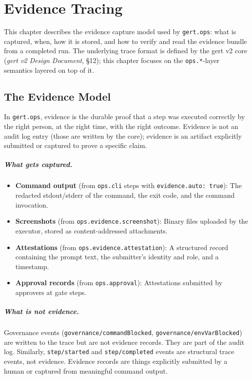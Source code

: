 \chapter{Evidence Tracing}
\label{ch:evidence-tracing}

This chapter describes the evidence capture model used by \texttt{gert.ops}: what is captured,
when, how it is stored, and how to verify and read the evidence bundle from a completed run.
The underlying trace format is defined by the gert v2 core (\emph{gert v2 Design Document}, §12);
this chapter focuses on the \texttt{ops.*}-layer semantics layered on top of it.

\section{The Evidence Model}
\label{sec:evidence-model}

In \texttt{gert.ops}, evidence is the durable proof that a step was executed correctly by
the right person, at the right time, with the right outcome. Evidence is not an audit log
entry (those are written by the core); evidence is an artifact explicitly submitted or
captured to prove a specific claim.

\paragraph{What gets captured.}
\begin{itemize}
  \item \textbf{Command output} (from \texttt{ops.cli} steps with \texttt{evidence.auto: true}):
    The redacted stdout/stderr of the command, the exit code, and the command invocation.
  \item \textbf{Screenshots} (from \texttt{ops.evidence.screenshot}): Binary files uploaded
    by the executor, stored as content-addressed attachments.
  \item \textbf{Attestations} (from \texttt{ops.evidence.attestation}): A structured record
    containing the prompt text, the submitter's identity and role, and a timestamp.
  \item \textbf{Approval records} (from \texttt{ops.approval}): Attestations submitted by
    approvers at gate steps.
\end{itemize}

\paragraph{What is \emph{not} evidence.}
Governance events (\texttt{governance/commandBlocked}, \texttt{governance/envVarBlocked}) are
written to the trace but are not evidence records. They are part of the audit log. Similarly,
\texttt{step/started} and \texttt{step/completed} events are structural trace events, not
evidence. Evidence records are things explicitly submitted by a human or captured from
meaningful command output.

